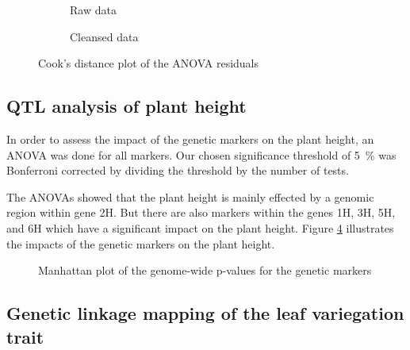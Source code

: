 \begin{figure}[htbp]
    \begin{subfigure}[t]{.48\textwidth}
        
        \caption{Raw data}
        \label{fig:raw_aov_height_residuals_cooks_dist}
    \end{subfigure}
    \begin{subfigure}[t]{.48\textwidth}
        
        \caption{Cleansed data}
        \label{fig:clean_aov_height_residuals_cooks_dist}
    \end{subfigure}
    \caption{Cook's distance plot of the ANOVA residuals}
    \label{fig:aov_height_residuals_cooks_dist}
\end{figure}

\subsection{QTL analysis of plant height}

In order to assess the impact of the genetic markers on the plant height, an ANOVA was done for all markers. Our chosen significance threshold of \qty{5}{\percent} was Bonferroni corrected by dividing the threshold by the number of tests.

The ANOVAs showed that the plant height is mainly effected by a genomic region within gene 2H. But there are also markers within the genes 1H, 3H, 5H, and 6H which have a significant impact on the plant height. Figure \ref{fig:clean_height_marker_effects_manhattan} illustrates the impacts of the genetic markers on the plant height.

\begin{figure}[htbp]
    
    \caption{Manhattan plot of the genome-wide p-values for the genetic markers}
    \label{fig:clean_height_marker_effects_manhattan}
\end{figure}

\subsection{Genetic linkage mapping of the leaf variegation trait}

